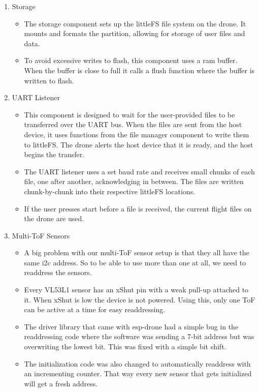 \documentclass[12pt, titlepage]{article}
\begin{document}
\begin{enumerate}
\begin{itemize}
    \end{itemize}
  \item Storage
    \begin{itemize}
      \item The storage component sets up the littleFS file system on the drone. It mounts and formats the partition, allowing for storage of user files and data. 
      \item To avoid excessive writes to flash, this component uses a ram buffer. When the buffer is close to full it calls a flush function where the buffer is written to flash.
    \end{itemize}
  \item UART Listener
    \begin{itemize}
      \item This component is designed to wait for the user-provided files to be transferred over the UART bus. When the files are sent from the host device, it uses functions from the file manager component to write them to littleFS. The drone alerts the host device that it is ready, and the host begins the transfer.
      \item The UART listener uses a set baud rate and receives small chunks of each file, one after another, acknowledging in between. The files are written chunk-by-chunk into their respective littleFS locations. 
      \item If the user presses start before a file is received, the current flight files on the drone are used.
    \end{itemize}
  \item Multi-ToF Sensors
    \begin{itemize}
      \item A big problem with our multi-ToF sensor setup is that they all have the same i2c address. So to be able to use more than one at all, we need to readdress the sensors. 
      \item Every VL53L1 sensor has an xShut pin with a weak pull-up attached to it. When xShut is low the device is not powered. Using this, only one ToF can be active at a time for easy readdressing. 
      \item The driver library that came with esp-drone had a simple bug in the readdressing code where the software was sending a 7-bit address but was overwriting the lowest bit. This was fixed with a simple bit shift. 
      \item The initialization code was also changed to automatically readdress with an incrementing counter. That way every new sensor that gets initialized will get a fresh address.

\end{itemize}
\end{enumerate}
\end{document}
